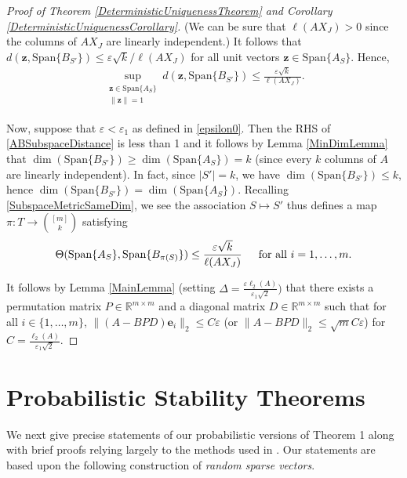 \documentclass[journal, onecolumn]{IEEEtran}
\begin{document}
\begin{proof}[Proof of Theorem \ref{DeterministicUniquenessTheorem} and Corollary \ref{DeterministicUniquenessCorollary}]
(We can be sure that $\ell(AX_J) > 0$ since the columns of $AX_J$ are linearly independent.) It follows that $d(\mathbf{z}, \text{Span}\{B_{S'}\}) \leq \varepsilon\sqrt{k} / \ell(AX_J)$ for all unit vectors $\mathbf{z} \in \text{Span}\{A_{S}\}$. Hence,
\begin{align}\label{ABSubspaceDistance}
\sup_{ \substack{ \mathbf{z} \in \text{Span}\{A_{S}\} \\ \|\mathbf{z}\| = 1} } d(\mathbf{z}, \text{Span}\{B_{S'}\}) \leq \frac{\varepsilon\sqrt{k}}{\ell(AX_J)}.
\end{align}

Now, suppose that $\varepsilon <  \varepsilon_1$ as defined in \eqref{epsilon0}. Then the RHS of \eqref {ABSubspaceDistance} is less than 1 and it follows by Lemma \ref{MinDimLemma} that $\dim(\text{Span}\{B_{S'}\}) \geq \dim(\text{Span}\{A_{S}\}) = k$ (since every $k$ columns of $A$ are linearly independent). In fact, since $|S'| = k$, we have $\dim(\text{Span}\{B_{S'}\}) \leq k$, hence $\dim(\text{Span}\{B_{S'}\}) = \dim(\text{Span}\{A_{S}\})$. Recalling \eqref{SubspaceMetricSameDim},  we see the association $S \mapsto S'$ thus defines a map $\pi: T \to {[m] \choose k}$ satisfying
\begin{align*}
\Theta(\text{Span}\{A_{S}\}, \text{Span}\{B_{\pi(S)}\}) \leq \frac{\varepsilon\sqrt{k}}{\ell(AX_J)} \indent \text{for all } i = 1, \ldots, m.
\end{align*}

It follows by Lemma \ref{MainLemma} (setting $\Delta =  \frac{\varepsilon \ell_2(A)}{\varepsilon_1 \sqrt{2}} )$ that there exists a permutation matrix $P \in \mathbb{R}^{m \times m}$ and a diagonal matrix $D \in \mathbb{R}^{m \times m}$ such that for all $i \in \{1, \ldots, m\}$,
$\|(A - BPD)\mathbf{e}_i\|_2 \leq C\varepsilon$ (or $\|A-BPD\|_2 \leq \sqrt{m}C\varepsilon$) for $C = \frac{\ell_2(A)}{\varepsilon_1\sqrt{2}}$.
\end{proof}


\section{Probabilistic Stability Theorems}\label{PUT}

We next give precise statements of our probabilistic versions of Theorem 1 along with brief proofs relying largely to the methods used in \cite{HS11}. Our statements are based upon the following construction of \emph{random sparse vectors}.
\end{document}
